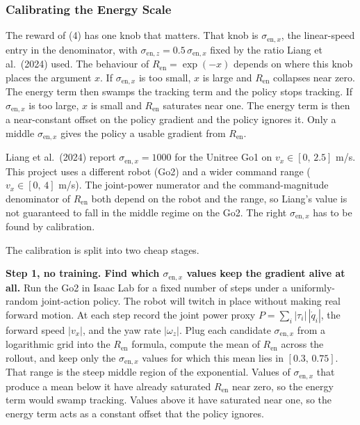 \subsubsection{Calibrating the Energy Scale}

The reward of (4) has one knob that matters. That knob is $\sigma_{\mathrm{en},x}$, the linear-speed entry in the denominator, with $\sigma_{\mathrm{en},z} = 0.5\,\sigma_{\mathrm{en},x}$ fixed by the ratio Liang et al.\ (2024) used. The behaviour of $R_{\mathrm{en}} = \exp(-x)$ depends on where this knob places the argument $x$. If $\sigma_{\mathrm{en},x}$ is too small, $x$ is large and $R_{\mathrm{en}}$ collapses near zero. The energy term then swamps the tracking term and the policy stops tracking. If $\sigma_{\mathrm{en},x}$ is too large, $x$ is small and $R_{\mathrm{en}}$ saturates near one. The energy term is then a near-constant offset on the policy gradient and the policy ignores it. Only a middle $\sigma_{\mathrm{en},x}$ gives the policy a usable gradient from $R_{\mathrm{en}}$.

Liang et al.\ (2024) report $\sigma_{\mathrm{en},x} = 1000$ for the Unitree Go1 on $v_x \in [0,\, 2.5]$ m/s. This project uses a different robot (Go2) and a wider command range ($v_x \in [0,\, 4]$ m/s). The joint-power numerator and the command-magnitude denominator of $R_{\mathrm{en}}$ both depend on the robot and the range, so Liang's value is not guaranteed to fall in the middle regime on the Go2. The right $\sigma_{\mathrm{en},x}$ has to be found by calibration.

The calibration is split into two cheap stages.

\textbf{Step 1, no training. Find which $\sigma_{\mathrm{en},x}$ values keep the gradient alive at all.} Run the Go2 in Isaac Lab for a fixed number of steps under a uniformly-random joint-action policy. The robot will twitch in place without making real forward motion. At each step record the joint power proxy $P = \sum_i |\tau_i|\,|\dot q_i|$, the forward speed $|v_x|$, and the yaw rate $|\omega_z|$. Plug each candidate $\sigma_{\mathrm{en},x}$ from a logarithmic grid into the $R_{\mathrm{en}}$ formula, compute the mean of $R_{\mathrm{en}}$ across the rollout, and keep only the $\sigma_{\mathrm{en},x}$ values for which this mean lies in $[0.3,\, 0.75]$. That range is the steep middle region of the exponential. Values of $\sigma_{\mathrm{en},x}$ that produce a mean below it have already saturated $R_{\mathrm{en}}$ near zero, so the energy term would swamp tracking. Values above it have saturated near one, so the energy term acts as a constant offset that the policy ignores.

